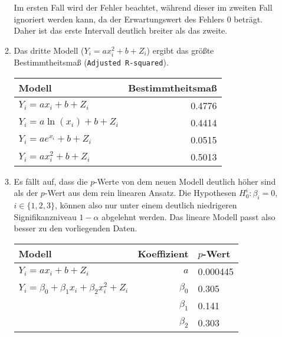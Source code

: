 \documentclass[a4paper]{scrartcl}
\def \blattnr {10}
\begin{document}
\begin{enumerate}[label=\bfseries \blattnr.\arabic*]
\begin{enumerate}
         Im ersten Fall wird der Fehler
         beachtet, während dieser im zweiten Fall ignoriert werden kann, da der
         Erwartungswert des Fehlers 0 beträgt. Daher ist das erste Intervall
         deutlich breiter als das zweite.
     \item %
         Das dritte Modell ($Y_i = a x_i^2 + b + Z_i$) ergibt das größte
         Bestimmtheitsmaß (\texttt{Adjusted R-squared}).
         \begin{table}[h]
             \centering
             \begin{tabular}{l|r}
                 Modell & Bestimmtheitsmaß \\ \hline
                 $Y_i = a x_i + b + Z_i$      & \num{0.4776} \\
                 $Y_i = a \ln(x_i) + b + Z_i$ & \num{0.4414} \\
                 $Y_i = a e^{x_i} + b + Z_i$  & \num{0.0515} \\
                 $Y_i = a x_i^2 + b + Z_i$    & \num{0.5013} \\
             \end{tabular}
         \end{table}
     \item %
         Es fällt auf, dass die $p$-Werte von dem neuen Modell deutlich höher
         sind als der $p$-Wert aus dem rein linearen Ansatz.
         Die Hypothesen $H_0^i: \beta_i = 0$, $i \in \{1,2,3\}$, können also
         nur unter einem deutlich niedrigeren Signifikanzniveau $1 - \alpha$
         abgelehnt werden.
         Das lineare Modell passt also besser zu den vorliegenden Daten.
         \begin{table}[h]
             \centering
             \begin{tabular}{l|r|l}
                 Modell & Koeffizient & $p$-Wert \\ \hline
                 $Y_i = a x_i + b + Z_i$ & $a$ & \num{0.000445} \\ \hline
                 $Y_i = \beta_0 + \beta_1x_i + \beta_2x_i^2 + Z_i$ & $\beta_0$ & \num{0.305} \\
                                                                   & $\beta_1$ & \num{0.141} \\
                                                                   & $\beta_2$ & \num{0.303} \\
             \end{tabular}
         \end{table}


\end{enumerate}
\end{enumerate}
\end{document}
